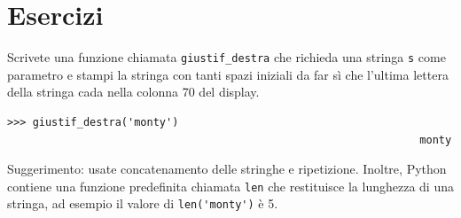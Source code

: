 \documentclass[10pt]{book}
\begin{document}
\section{Esercizi}

\begin{exercise}

Scrivete una funzione chiamata \verb"giustif_destra" che richieda una stringa {\tt s} come parametro e stampi la stringa con tanti spazi iniziali da far sì che l'ultima lettera della stringa cada nella colonna 70 del display.

\begin{verbatim}
>>> giustif_destra('monty')
                                                                 monty
\end{verbatim}

Suggerimento: usate concatenamento delle stringhe e ripetizione.  Inoltre,
Python contiene una funzione predefinita chiamata {\tt len} che restituisce la lunghezza di una stringa, ad esempio il valore di \verb"len('monty')" è 5.

\end{exercise}
\end{document}
